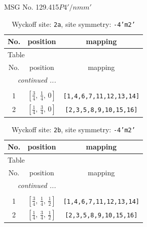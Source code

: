 \documentclass[fleqn,8pt]{jsarticle}
\begin{document}
\setcounter{MaxMatrixCols}{32}

\renewcommand{\tablename}{Table~}
\renewcommand{\figurename}{Figure~}
\begin{center}
\LARGE
MSG No. 129.415\quad$P4'/nmm'$
\end{center}
\renewcommand{\arraystretch}{1.2}
\begin{longtable}{ccc}
\caption{Wyckoff site: {\tt 2a}, site symmetry: {\tt -4'm2'}}
 \\
 \hline \hline
No. & position & mapping \\ \hline \endfirsthead

\multicolumn{2}{l}{\tablename\ \thetable{}} \\
 \hline \hline
No. & position & mapping \\ \hline \endhead

 \hline \hline
\multicolumn{2}{r}{\footnotesize\it continued ...} \\ \endfoot

 \hline \hline
\multicolumn{2}{r}{} \\ \endlastfoot

1 & $\left[ \frac{3}{4},\, \frac{1}{4},\, 0 \right]$ & {\tt [1,4,6,7,11,12,13,14]} \\ \hline
2 & $\left[ \frac{1}{4},\, \frac{3}{4},\, 0 \right]$ & {\tt [2,3,5,8,9,10,15,16]} \\
\end{longtable}
\renewcommand{\arraystretch}{1.2}
\begin{longtable}{ccc}
\caption{Wyckoff site: {\tt 2b}, site symmetry: {\tt -4'm2'}}
 \\
 \hline \hline
No. & position & mapping \\ \hline \endfirsthead

\multicolumn{2}{l}{\tablename\ \thetable{}} \\
 \hline \hline
No. & position & mapping \\ \hline \endhead

 \hline \hline
\multicolumn{2}{r}{\footnotesize\it continued ...} \\ \endfoot

 \hline \hline
\multicolumn{2}{r}{} \\ \endlastfoot

1 & $\left[ \frac{3}{4},\, \frac{1}{4},\, \frac{1}{2} \right]$ & {\tt [1,4,6,7,11,12,13,14]} \\ \hline
2 & $\left[ \frac{1}{4},\, \frac{3}{4},\, \frac{1}{2} \right]$ & {\tt [2,3,5,8,9,10,15,16]} \\
\end{longtable}
\end{document}

